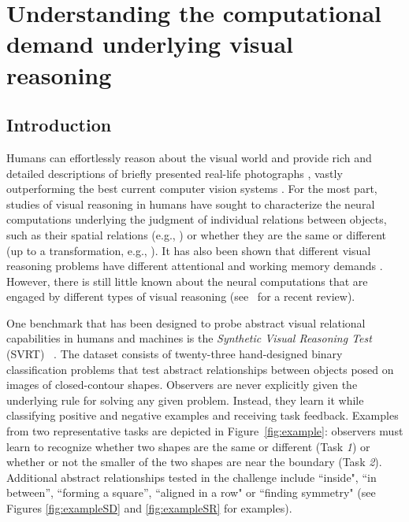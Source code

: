 \chapter[Computational Demands of Visual Reasoning]{Understanding the computational demand underlying visual reasoning}
\label{chapter1a}

\startcontents[chapters]
\printmyminitoc

\section{Introduction}

Humans can effortlessly reason about the visual world and provide rich and detailed descriptions of briefly presented real-life photographs \citep{Fei-Fei2007-zb}, vastly outperforming the best current computer vision systems \citep{Geman2015-jm, Kreiman2020-zd}. 
For the most part, studies of visual reasoning in humans have sought to characterize the neural computations underlying the judgment of individual relations between objects, such as their spatial relations (e.g., \citet{logan1994ability}) or whether they are the same or different (up to a transformation, e.g., \citet{shepard1971mental}). It has also been shown that different visual reasoning problems have different attentional and working memory demands \citep{logan1994spatial,Moore1994,Rosielle2002,Holcombe2011,vanderham2012,kroger2002recruitment,Golde2010,clevenger2014working,brady2015contextual}. However, there is still little known about the neural computations that are engaged by different types of visual reasoning (see~\citet{ricci37same} for a recent review). 

One benchmark that has been designed to probe abstract visual relational capabilities in humans and machines is the \textit{Synthetic Visual Reasoning Test} (SVRT) ~\citep{fleuret2011comparing}. The dataset consists of twenty-three hand-designed binary classification problems that test abstract relationships between objects posed on images of closed-contour shapes. Observers are never explicitly given the underlying rule for solving any given problem. Instead, they learn it while classifying positive and negative examples and receiving task feedback. Examples from two representative tasks are depicted in Figure~\ref{fig:example}: observers must learn to recognize whether two shapes are the same or different (Task \textit{1}) or whether or not the smaller of the two shapes are near the boundary (Task \textit{2}). Additional abstract relationships tested in the challenge include ``inside", ``in between”, ``forming a square”, ``aligned in a row" or ``finding symmetry" (see Figures \ref{fig:exampleSD} and \ref{fig:exampleSR} for examples).

